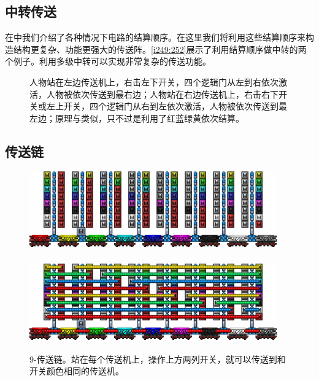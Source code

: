 \subsection{中转传送}
在中我们介绍了各种情况下电路的结算顺序。在这里我们将利用这些结算顺序来构造结构更复杂、功能更强大的传送阵。\autoref{i249:252}展示了利用结算顺序做中转的两个例子。利用多级中转可以实现非常复杂的传送功能。

\begin{figure}[!ht]
\begin{center}
\qquad
{}
\end{center}
\caption{\protect{}人物站在左边传送机上，右击左下开关，四个逻辑门从左到右依次激活，人物被依次传送到最右边；人物站在右边传送机上，右击右下开关或左上开关，四个逻辑门从右到左依次激活，人物被依次传送到最左边；\protect{}原理与\protect{}类似，只不过是利用了红蓝绿黄依次结算。}
\label{i249:252}
\end{figure}

\subsection{传送链}

\begin{figure}[!ht]
\centering
\includegraphics[width=0.95\textwidth]{images/381.png}\\
\mbox{}\\
\includegraphics[width=0.95\textwidth]{images/382.png}
\caption{9-传送链。站在每个传送机上，操作上方两列开关，就可以传送到和开关颜色相同的传送机。}\label{fig20}
\end{figure}

